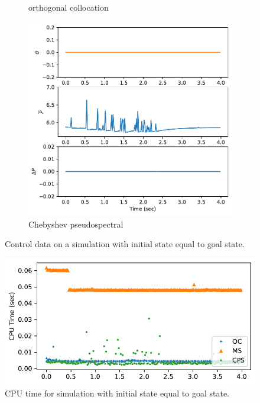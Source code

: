 \documentclass[]{article}
\begin{document}
\begin{figure}[H]
\begin{subfigure}[b]{0.3\textwidth}
		\caption{orthogonal collocation}
	\end{subfigure}%
	\begin{subfigure}[b]{0.3\textwidth}
		\centering
		\includegraphics[width=\textwidth]{figures/controlhover5.pdf}
		\caption{Chebyshev pseudospectral}
	\end{subfigure}
	\caption{Control data on a simulation with initial state equal to goal state.}
	\label{fig:controlhover}
\end{figure}


\begin{figure}[H]
	\centering
	\includegraphics[width=\textwidth]{figures/timehover.pdf}
	\caption{CPU time for simulation with initial state equal to goal state.}
	\label{fig:timehover}
\end{figure}
\end{document}

